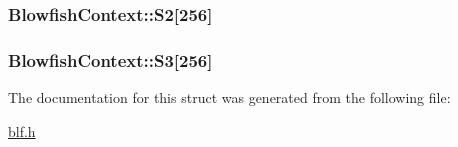 \hypertarget{structBlowfishContext_ad8104967f5b964f5c0c2f10443c1b2aa}{
\subsubsection[{S2}]{ Blowfish\-Context\-::\-S2\mbox{[}256\mbox{]}}}\label{structBlowfishContext_ad8104967f5b964f5c0c2f10443c1b2aa}
\hypertarget{structBlowfishContext_a82698e87c73d32dcd253a558f3ebb685}{
\subsubsection[{S3}]{ Blowfish\-Context\-::\-S3\mbox{[}256\mbox{]}}}\label{structBlowfishContext_a82698e87c73d32dcd253a558f3ebb685}


The documentation for this struct was generated from the following file\-:\begin{DoxyCompactItemize}
\item 
\hyperlink{blf_8h}{blf.\-h}\end{DoxyCompactItemize}
